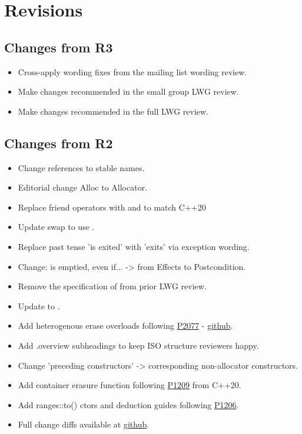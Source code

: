\section{Revisions}

\subsection{Changes from R3}

\begin{itemize}
  \item Cross-apply wording fixes from the  mailing list wording review.
  \item Make changes recommended in the small group LWG review.
  \item Make changes recommended in the full LWG review.
\end{itemize}

\subsection{Changes from R2}

\begin{itemize}
  \item Change references to stable names.
  \item Editorial change Alloc to Allocator.
  \item Replace friend operators with  and  to match C++20
  \item Update swap to use .
  \item Replace past tense 'is exited' with 'exits' via exception wording.
  \item {} Change:  is emptied, even if...  -> from Effects to Postcondition.
  \item Remove the specification of  from prior LWG review.
  \item Update  to .
  \item Add heterogenous erase overloads following \href{https://wg21.link/P2077}{P2077} - \href{https://github.com/tzlaine/flat_map/commit/a241df6b978479f0cc135ec567dbea4cd7407dd6}{github}.
  \item Add .overview subheadings to keep ISO structure reviewers happy.
  \item Change 'preceding constructors' -> corresponding non-allocator constructors.
  \item Add container erasure  function following \href{https://wg21.link/P1209}{P1209} from C++20.
  \item Add ranges::to() ctors and deduction guides following \href{https://wg21.link/P1206}{P1206}.
  \item Full change diffs available at \href{https://github.com/tzlaine/flat_map/commits/flat_set}{github}.
\end{itemize}

